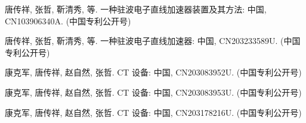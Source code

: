 \begin{resume}
  \begin{achievements}
	  \item 唐传祥, 张哲, 靳清秀, 等. 一种驻波电子直线加速器装置及其方法: 中国, CN103906340A. (中国专利公开号)
    \item 唐传祥, 张哲, 靳清秀, 等. 一种驻波电子直线加速器: 中国, CN203233589U. (中国专利公开号)
    \item 康克军, 唐传祥, 赵自然, 张哲. CT 设备: 中国, CN203083952U. (中国专利公开号)
    \item 康克军, 唐传祥, 赵自然, 张哲. CT 设备: 中国, CN203083953U. (中国专利公开号)
    \item 康克军, 唐传祥, 赵自然, 张哲. CT 设备: 中国, CN203178216U. (中国专利公开号)
  \end{achievements}

\end{resume}
